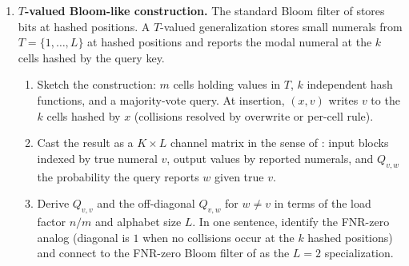 \begin{enumerate}
\item \exstarstarstar
\label{ex:ch9-11}
\textbf{$T$-valued Bloom-like construction.}
The standard Bloom filter of  stores
bits at hashed positions. A $T$-valued generalization stores
small numerals from $T = \{1, \ldots, L\}$ at hashed positions
and reports the modal numeral at the $k$ cells hashed by the
query key.
\begin{enumerate}
  \item[(a)] Sketch the construction: $m$ cells holding values
    in $T$, $k$ independent hash functions, and a majority-vote
    query. At insertion, $(x, v)$ writes $v$ to the $k$ cells
    hashed by $x$ (collisions resolved by overwrite or per-cell
    rule).
  \item[(b)] Cast the result as a $K \times L$ channel matrix in
    the sense of : input blocks indexed
    by true numeral $v$, output values by reported numerals, and
    $Q_{v, w}$ the probability the query reports $w$ given true
    $v$.
  \item[(c)] Derive $Q_{v, v}$ and the off-diagonal $Q_{v, w}$
    for $w \ne v$ in terms of the load factor $n / m$ and
    alphabet size $L$. In one sentence, identify the FNR-zero
    analog (diagonal is $1$ when no collisions occur at the $k$
    hashed positions) and connect to the FNR-zero Bloom filter
    of  as the $L = 2$ specialization.
\end{enumerate}

\end{enumerate}
